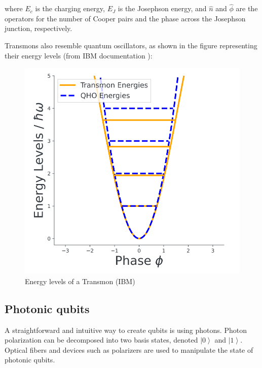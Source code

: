 \documentclass{article}
\begin{document}
\begin{multicols}{2}
where \(E_c\) is the charging energy, \(E_J\) is the Josephson energy, and \(\hat{n}\) and \(\hat{\phi}\) are the operators for the number of Cooper pairs and the phase across the Josephson junction, respectively.

Transmons also resemble quantum oscillators, as shown in the figure representing their energy levels (from IBM documentation \cite{noauthor_introduction_nodate}):

\begin{figure}[H]
    \centering
    \includegraphics[width = \columnwidth]{fig/transfon.png}
    \caption{Energy levels of a Transmon (IBM)}
    \label{fig:Transmon}
\end{figure}

\subsection{Photonic qubits}

A straightforward and intuitive way to create qubits is using photons. Photon polarization can be decomposed into two basis states, denoted \( \left|0\right> \) and \( \left|1\right> \). Optical fibers and devices such as polarizers are used to manipulate the state of photonic qubits.


\end{multicols}
\end{document}
